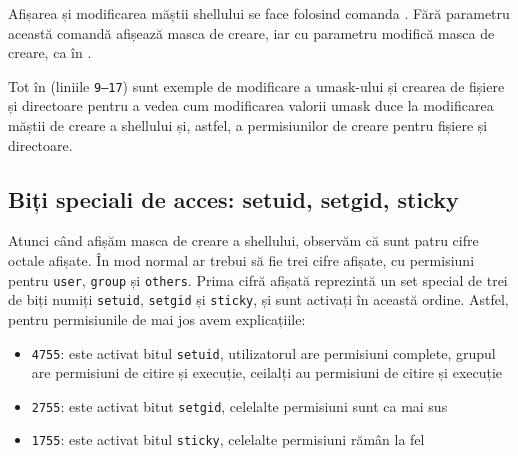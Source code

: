 Afișarea și modificarea măștii shellului se face folosind comanda .
Fără parametru această comandă afișează masca de creare, iar cu parametru modifică masca de creare, ca în .


Tot în  (liniile \texttt{9--17}) sunt exemple de modificare a umask-ului și crearea de fișiere și directoare pentru a vedea cum modificarea valorii umask duce la modificarea măștii de creare a shellului și, astfel, a permisiunilor de creare pentru fișiere și directoare.

\subsection{Biți speciali de acces: setuid, setgid, sticky}
\label{sec:user:special-bits}

Atunci când afișăm masca de creare a shellului, observăm că sunt patru cifre octale afișate.
În mod normal ar trebui să fie trei cifre afișate, cu permisiuni pentru \texttt{user}, \texttt{group} și \texttt{others}.
Prima cifră afișată reprezintă un set special de trei de biți numiți \texttt{setuid}, \texttt{setgid} și \texttt{sticky}, și sunt activați în această ordine.
 Astfel, pentru permisiunile de mai jos avem explicațiile:

\begin{itemize}
  \item \texttt{4755}: este activat bitul \texttt{setuid}, utilizatorul are permisiuni complete, grupul are permisiuni de citire și execuție, ceilalți au permisiuni de citire și execuție
  \item \texttt{2755}: este activat bitut \texttt{setgid}, celelalte permisiuni sunt ca mai sus
  \item \texttt{1755}: este activat bitul \texttt{sticky}, celelalte permisiuni rămân la fel
\end{itemize}

